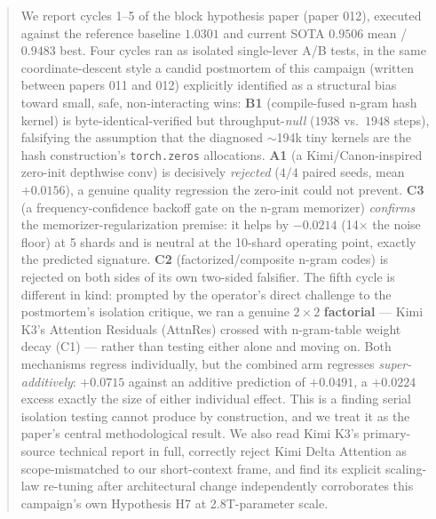 \documentclass{article}
\begin{document}
\printAffiliationsAndNotice{}

\begin{abstract}
We report cycles 1--5 of the block hypothesis paper (paper 012), executed against the reference baseline $1.0301$ and current SOTA $0.9506$ mean / $0.9483$ best. Four cycles ran as isolated single-lever A/B tests, in the same coordinate-descent style a candid postmortem of this campaign (written between papers 011 and 012) explicitly identified as a structural bias toward small, safe, non-interacting wins: \textbf{B1} (compile-fused n-gram hash kernel) is byte-identical-verified but throughput-\emph{null} ($1938$ vs.\ $1948$ steps), falsifying the assumption that the diagnosed $\sim$194k tiny kernels are the hash construction's \texttt{torch.zeros} allocations. \textbf{A1} (a Kimi/Canon-inspired zero-init depthwise conv) is decisively \emph{rejected} ($4/4$ paired seeds, mean $+0.0156$), a genuine quality regression the zero-init could not prevent. \textbf{C3} (a frequency-confidence backoff gate on the n-gram memorizer) \emph{confirms} the memorizer-regularization premise: it helps by $-0.0214$ (14$\times$ the noise floor) at 5 shards and is neutral at the 10-shard operating point, exactly the predicted signature. \textbf{C2} (factorized/composite n-gram codes) is rejected on both sides of its own two-sided falsifier. The fifth cycle is different in kind: prompted by the operator's direct challenge to the postmortem's isolation critique, we ran a genuine $2\times2$ \textbf{factorial} --- Kimi K3's Attention Residuals (AttnRes) crossed with n-gram-table weight decay (C1) --- rather than testing either alone and moving on. Both mechanisms regress individually, but the combined arm regresses \emph{super-additively}: $+0.0715$ against an additive prediction of $+0.0491$, a $+0.0224$ excess exactly the size of either individual effect. This is a finding serial isolation testing cannot produce by construction, and we treat it as the paper's central methodological result. We also read Kimi K3's primary-source technical report in full, correctly reject Kimi Delta Attention as scope-mismatched to our short-context frame, and find its explicit scaling-law re-tuning after architectural change independently corroborates this campaign's own Hypothesis H7 at 2.8T-parameter scale.
\end{abstract}
\end{document}
